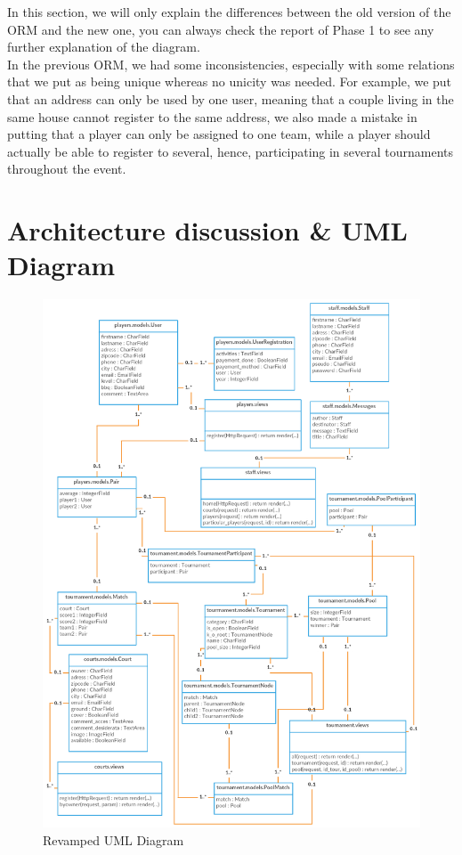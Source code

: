 \documentclass[a4paper, 12pt]{article}
\begin{document}
In this section, we will only explain the differences between the old version of the ORM and the new one, you can always check the report of Phase 1 to see any further explanation of the diagram. \\

In the previous ORM, we had some inconsistencies, especially with some relations that we put as being unique whereas no unicity was needed. For example, we put that an address can only be used by one user, meaning that a couple living in the same house cannot register to the same address, we also made a mistake in putting that a player can only be assigned to one team, while a player should actually be able to register to several, hence, participating in several tournaments throughout the event.\\
 
\newpage
\section{Architecture discussion \& UML Diagram}

\begin{figure}[h]
\caption{\label{uml2} Revamped UML Diagram}
\includegraphics[scale=0.6]{UMLp2.PNG}
\end{figure}
\end{document}
